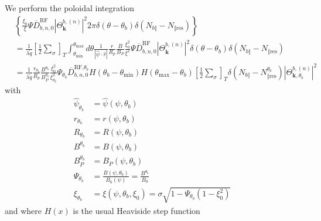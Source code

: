 We perform the poloidal integration
\begin{align}
&  \left\{  \frac{\xi_{0}}{\xi}\Psi\overline{D}_{b,n,0}^{\text{RF}}\left|
\Theta_{\mathbf{k}}^{b,\left(  n\right)  }\right|  ^{2}2\pi\delta\left(
\theta-\theta_{b}\right)  \delta\left(  N_{b\Vert}-N_{\Vert\text{res}}\right)
\right\}  \nonumber\\
&  =\frac{1}{\lambda\widetilde{q}}\left[  \frac{1}{2}\sum\limits_{\sigma
}\right]  _{T}\int_{\theta_{\min}}^{\theta_{\max}}d\theta\frac{1}{\left|
\widehat{\psi}\cdot\widehat{r}\right|  }\frac{r}{R_{p}}\frac{B}{B_{P}}%
\frac{\xi_{0}^{2}}{\xi^{2}}\Psi\overline{D}_{b,n,0}^{\text{RF}}\left|
\Theta_{\mathbf{k}}^{b,\left(  n\right)  }\right|  ^{2}\delta\left(
\theta-\theta_{b}\right)  \delta\left(  N_{b\Vert}-N_{\Vert\text{res}}\right)
\\
&  =\frac{1}{\lambda\widetilde{q}}\frac{r_{\theta_{b}}}{R_{p}}\frac
{B^{\theta_{b}}}{B_{P}^{\theta_{b}}}\frac{\xi_{0}^{2}}{\xi_{\theta_{b}}^{2}%
}\Psi_{\theta_{b}}\overline{D}_{b,n,0}^{\text{RF,}\theta_{b}}H\left(
\theta_{b}-\theta_{\min}\right)  H\left(  \theta_{\max}-\theta_{b}\right)
\left[  \frac{1}{2}\sum\limits_{\sigma}\right]  _{T}\delta\left(  N_{b\Vert
}-N_{\Vert\text{res}}^{\theta_{b}}\right)  \left|  \Theta_{\mathbf{k,}%
\theta_{b}}^{b,\left(  n\right)  }\right|  ^{2}%
\end{align}
with%
\begin{align}
\widehat{\psi}_{\theta_{b}} &  =\widehat{\psi}(\psi,\theta_{b})\\
r_{\theta_{b}} &  =r\left(  \psi,\theta_{b}\right)  \\
R_{\theta_{b}} &  =R\left(  \psi,\theta_{b}\right)  \\
B^{\theta_{b}} &  =B\left(  \psi,\theta_{b}\right)  \\
B_{P}^{\theta_{b}} &  =B_{P}\left(  \psi,\theta_{b}\right)  \\
\Psi_{\theta_{b}} &  =\frac{B\left(  \psi,\theta_{b}\right)  }{B_{0}\left(
\psi\right)  }=\frac{B^{\theta_{b}}}{B_{0}}\\
\xi_{\theta_{b}} &  =\xi\left(  \psi,\theta_{b},\xi_{0}\right)  =\sigma
\sqrt{1-\Psi_{\theta_{b}}\left(  1-\xi_{0}^{2}\right)  }%
\end{align}
and where $H\left(  x\right)  $ is the usual Heaviside step function

